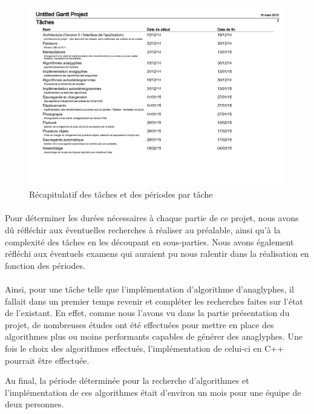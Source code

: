 \begin{figure}[h]
	\centering
	\includegraphics[scale=0.6]{gantp.pdf}
	\caption{\label{fig:gantP} Récapitulatif des tâches et des périodes par tâche \protect \footnotemark }
\end{figure}

\paragraph{}
Pour déterminer les durées nécessaires à chaque partie de ce projet, nous avons dû réfléchir aux éventuelles recherches à réaliser au préalable, ainsi qu'à la complexité des tâches en les découpant en sous-parties. Nous avons également réfléchi aux éventuels examens qui auraient pu nous ralentir dans la réalisation en fonction des périodes.

\paragraph{}
Ainsi, pour une tâche telle que l'implémentation d'algorithme d'anaglyphes, il fallait dans un premier temps revenir et compléter les recherches faites sur l'état de l'existant. En effet, comme nous l'avons vu dans la partie présentation du projet, de nombreuses études ont été effectuées pour mettre en place des algorithmes plus ou moins performants capables de générer des anaglyphes. Une fois le choix des algorithmes effectués, l'implémentation de celui-ci en C++ pourrait être effectuée.

Au final, la période déterminée pour la recherche d'algorithmes et l'implémentation de ces algorithmes était d'environ un mois pour une équipe de deux personnes.

